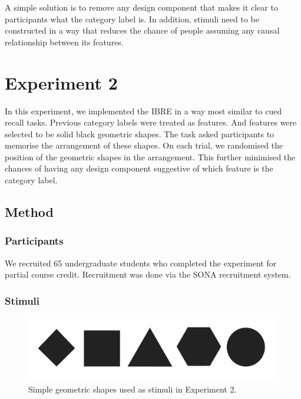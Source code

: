 \documentclass[10pt,letterpaper]{article}
\begin{document}
A simple solution is to remove any design component that makes it clear to participants what the category label is.
In addition, stimuli need to be constructed in a way that reduces the chance of people assuming any causal relationship between its features.

\section{Experiment 2}

In this experiment, we implemented the IBRE in a way most similar to cued recall tasks.
Previous category labels were treated as features.
And features were selected to be solid black geometric shapes.
The task asked participants to memorise the arrangement of these shapes.
On each trial, we randomised the position of the geometric shapes in the arrangement.
This further minimised the chances of having any design component suggestive of which feature is the category label.

\subsection{Method}

\subsubsection{Participants}

We recruited 65 undergraduate students who completed the experiment for partial course credit.
Recruitment was done via the SONA recruitment system. \\

\subsubsection{Stimuli}

\begin{figure}
  \begin{center}
    \caption{Simple geometric shapes used as stimuli in Experiment 2.}
    \label{figure:exp2-stimuli}
    \includegraphics[scale=0.15]{figures/experiment_2_stimuli.pdf}
  \end{center}
\end{figure}
\end{document}

